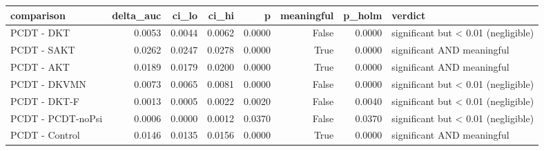 \begin{tabular}{lrrrrrrl}
\toprule
comparison & delta\_auc & ci\_lo & ci\_hi & p & meaningful & p\_holm & verdict \\
\midrule
PCDT - DKT & 0.0053 & 0.0044 & 0.0062 & 0.0000 & False & 0.0000 & significant but < 0.01 (negligible) \\
PCDT - SAKT & 0.0262 & 0.0247 & 0.0278 & 0.0000 & True & 0.0000 & significant AND meaningful \\
PCDT - AKT & 0.0189 & 0.0179 & 0.0200 & 0.0000 & True & 0.0000 & significant AND meaningful \\
PCDT - DKVMN & 0.0073 & 0.0065 & 0.0081 & 0.0000 & False & 0.0000 & significant but < 0.01 (negligible) \\
PCDT - DKT-F & 0.0013 & 0.0005 & 0.0022 & 0.0020 & False & 0.0040 & significant but < 0.01 (negligible) \\
PCDT - PCDT-noPsi & 0.0006 & 0.0000 & 0.0012 & 0.0370 & False & 0.0370 & significant but < 0.01 (negligible) \\
PCDT - Control & 0.0146 & 0.0135 & 0.0156 & 0.0000 & True & 0.0000 & significant AND meaningful \\
\bottomrule
\end{tabular}
